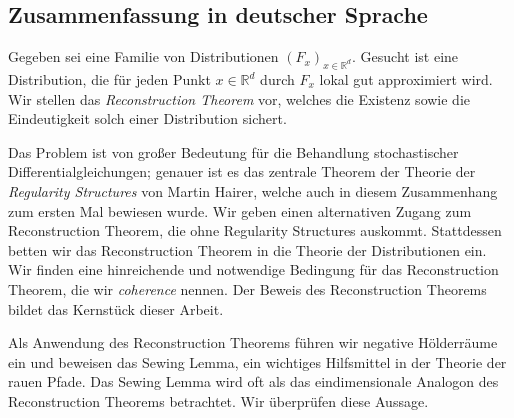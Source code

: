 \documentclass[masters]{ucbthesis}
\theoremstyle{definition}
\begin{document}
\begin{alwayssingle}
\section*{Zusammenfassung in deutscher Sprache}

Gegeben sei eine Familie von Distributionen \( (F_x)_{x \in \mathbb{R}^d} \). Gesucht ist eine Distribution, die für jeden Punkt \( x \in \mathbb{R}^d \) durch \( F_x \) lokal gut approximiert wird. Wir stellen das \emph{Reconstruction Theorem} vor, welches die Existenz sowie die Eindeutigkeit solch einer Distribution sichert. 

Das Problem ist von großer Bedeutung für die Behandlung stochastischer Differentialgleichungen; genauer ist es das zentrale Theorem der Theorie der \emph{Regularity Structures} von Martin Hairer, welche auch in diesem Zusammenhang zum ersten Mal bewiesen wurde. Wir geben einen alternativen Zugang zum Reconstruction Theorem, die ohne Regularity Structures auskommt. Stattdessen betten wir das Reconstruction Theorem in die Theorie der Distributionen ein.
Wir finden eine hinreichende und notwendige Bedingung für das Reconstruction Theorem, die wir \emph{coherence} nennen. Der Beweis des Reconstruction Theorems bildet das Kernstück dieser Arbeit. 

Als Anwendung des Reconstruction Theorems führen wir negative Hölderräume ein und beweisen das Sewing Lemma, ein wichtiges Hilfsmittel in der Theorie der rauen Pfade. Das Sewing Lemma wird oft als das eindimensionale Analogon des Reconstruction Theorems betrachtet. Wir überprüfen diese Aussage.

\end{alwayssingle}



\begin{frontmatter}


\tableofcontents
\clearpage


\end{frontmatter}

\pagestyle{headings}



% 






\printbibliography

\end{document}
